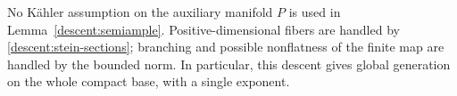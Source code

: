 \begin{remark}
No Kähler assumption on the auxiliary manifold \(P\) is used in
Lemma~\ref{descent:semiample}.  Positive-dimensional fibers are
handled by \eqref{descent:stein-sections}; branching and possible
nonflatness of the finite map are handled by the bounded norm.
In particular, this descent gives global generation on the whole
compact base, with a single exponent.
\end{remark}


